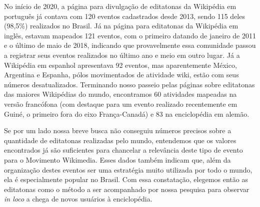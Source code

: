No início de 2020, a página para divulgação de editatonas da Wikipédia em português já contava com 120 eventos cadastrados desde 2013, sendo 115 deles (98,5\%) realizados no Brasil. Já na página para editatonas da Wikipédia em inglês, estavam mapeados 121 eventos, com o primeiro datando de janeiro de 2011 e o último de maio de 2018, indicando que provavelmente essa comunidade passou a registrar seus eventos realizados no último ano e meio em outro lugar. Já a Wikipédia em espanhol apresentava 92 eventos, mas aparentemente México, Argentina e Espanha, pólos movimentados de atividade wiki, estão com seus números desatualizados. Terminando nosso passeio pelas páginas sobre editatonas das maiores Wikipédias do mundo, encontramos 60 atividades mapeadas na versão francófona (com destaque para um evento realizado recentemente em Guiné, o primeiro fora do eixo França-Canadá) e 83 na enciclopédia em alemão.

Se por um lado nossa breve busca não conseguiu números precisos sobre a quantidade de editatonas realizadas pelo mundo, entendemos que os valores encontrados já são suficientes para chancelar a relevância deste tipo de evento para o Movimento Wikimedia. Esses dados também indicam que, além da organização destes eventos ser uma estratégia muito utilizada por todo o mundo, ela é especialmente popular no Brasil. Com essa constatação, elegemos então as editatonas como o método a ser acompanhado por nossa pesquisa para observar \textit{in loco} a chega de novos usuários à enciclopédia.
